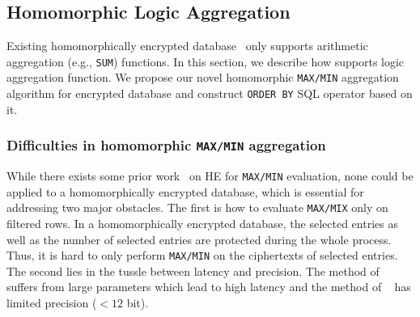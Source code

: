 \subsection{Homomorphic Logic Aggregation}
Existing homomorphically encrypted database~\cite{aphadb} only supports 
arithmetic aggregation (e.g., \texttt{SUM}) functions.
In this section, we describe how \NAME 
supports logic aggregation function.
We propose our novel 
homomorphic \texttt{MAX/MIN} aggregation algorithm for encrypted database
and construct \texttt{ORDER BY} SQL operator based on it.

\subsubsection{Difficulties in homomorphic \texttt{MAX/MIN} aggregation}
While there exists some prior work~\cite{ckkscomparison, pegasus} 
on HE for \texttt{MAX/MIN} evaluation, 
none could be applied to a homomorphically encrypted database, 
which is essential for addressing two major obstacles.
The first is how to evaluate \texttt{MAX/MIX} only on filtered rows.
In a homomorphically encrypted database, the selected entries as well as 
the number of selected entries are protected during the whole process.
Thus, it is hard to only perform \texttt{MAX/MIN} on 
the ciphertexts of selected entries.
The second lies in the tussle between latency and precision.
The method of ~\cite{ckkscomparison} suffers from large parameters
which lead to high latency and the method of ~\cite{pegasus}
has limited precision ($< 12$ bit).

